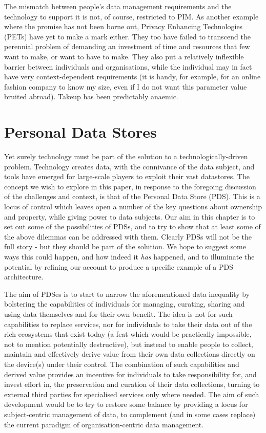 \documentclass[graybox]{svmult}
\begin{document}
The mismatch between people’s data management requirements and the technology to support it is not, of course, restricted to PIM. As another example where the promise has not been borne out, Privacy Enhancing Technologies (PETs) \cite{wang2006privacy} have yet to make a mark either. They too have failed to transcend the perennial problem of demanding an investment of time and resources that few want to make, or want to have to make. They also put a relatively inflexible barrier between individuals and organisations, while the individual may in fact have very context-dependent requirements (it is handy, for example, for an online fashion company to know my size, even if I do not want this parameter value bruited abroad). Takeup has been predictably anaemic.

\section{Personal Data Stores}

Yet surely technology must be part of the solution to a technologically-driven problem. Technology creates data, with the connivance of the data subject, and tools have emerged for large-scale players to exploit their vast datastores. The concept we wish to explore in this paper, in response to the foregoing discussion of the challenges and context, is that of the Personal Data Store (PDS). This is a locus of control which leaves open a number of the key questions about ownership and property, while giving power to data subjects. Our aim in this chapter is to set out some of the possibilities of PDSs, and to try to show that at least some of the above dilemmas can be addressed with them. Clearly PDSs will not be the full story - but they should be part of the solution. We hope to suggest some ways this could happen, and how indeed it {\em has} happened, and to illuminate the potential by refining our account to produce a specific example of a PDS architecture.

The aim of PDSes is to start to narrow the aforementioned data inequality by bolstering the capabilities of individuals for managing, curating, sharing and using data themselves and for their own benefit.  The idea is not for such capabilities to replace services, nor for individuals to take their data out of the rich ecosystems that exist today (a feat which would be practically impossible, not to mention potentially destructive), but instead to enable people to collect, maintain and effectively derive value from their own data collections directly on the device(s) under their control.  The combination of such capabilities and derived value provides an incentive for individuals to take responsibility for, and invest effort in, the preservation and curation of their data collections, turning to external third parties for specialised services only where needed.  The aim of such development would be to try to restore some balance by providing a locus for subject-centric management of data, to complement (and in some cases replace) the current paradigm of organisation-centric data management.
\end{document}
